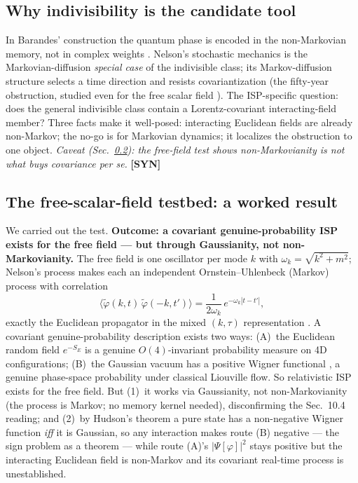\documentclass[aps,prd,preprint,amsmath,amssymb,nofootinbib,superscriptaddress]{revtex4-2}
\begin{document}
\subsection{Why indivisibility is the candidate tool}
In Barandes' construction the quantum phase is encoded in the non-Markovian memory, not in
complex weights \cite{Barandes2023a,Barandes2025}. Nelson's stochastic mechanics is the
Markovian-diffusion \emph{special case} of the indivisible class; its Markov-diffusion
structure selects a time direction and resists covariantization (the fifty-year obstruction,
studied even for the free scalar field \cite{FenyesNelsonCov}). The ISP-specific question:
does the general indivisible class contain a Lorentz-covariant interacting-field member?
Three facts make it well-posed: interacting Euclidean fields are already non-Markov; the no-go
is for Markovian dynamics; it localizes the obstruction to one object. \emph{Caveat
(Sec.~\ref{sec:freefield}): the free-field test shows non-Markovianity is not what buys
covariance per se.} \textbf{[SYN]}

\subsection{The free-scalar-field testbed: a worked result}
\label{sec:freefield}
We carried out the test. \textbf{Outcome: a covariant genuine-probability ISP exists for the
free field --- but through Gaussianity, not non-Markovianity.} The free field is one
oscillator per mode $k$ with $\omega_k=\sqrt{k^2+m^2}$; Nelson's process makes each an
independent Ornstein--Uhlenbeck (Markov) process with correlation
\begin{equation}
\langle\tilde\varphi(k,t)\,\tilde\varphi(-k,t')\rangle=\frac{1}{2\omega_k}\,e^{-\omega_k|t-t'|},
\end{equation}
exactly the Euclidean propagator in the mixed $(k,\tau)$ representation
\cite{GuerraRuggiero1973}. A covariant genuine-probability description exists two ways:
(A)~the Euclidean random field $e^{-S_E}$ is a genuine $O(4)$-invariant probability measure
on 4D configurations; (B)~the Gaussian vacuum has a positive Wigner functional
\cite{Hudson1974}, a genuine phase-space probability under classical Liouville flow. So
relativistic ISP exists for the free field. But (1)~it works via Gaussianity, not
non-Markovianity (the process is Markov; no memory kernel needed), disconfirming the
Sec.~10.4 reading; and (2)~by Hudson's theorem a pure state has a non-negative Wigner function
\emph{iff} it is Gaussian, so any interaction makes route (B) negative --- the sign problem
as a theorem --- while route (A)'s $|\Psi[\varphi]|^2$ stays positive but the interacting
Euclidean field is non-Markov and its covariant real-time process is unestablished.
\end{document}
